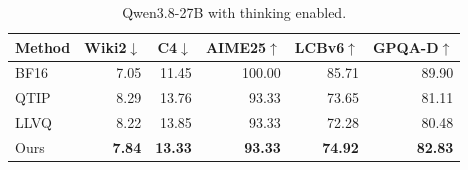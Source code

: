 \begin{table}[t]\centering\small
\caption{Qwen3.8-27B with thinking enabled.}
\label{tab:qwen38}
\begin{tabular}{lrrrrr}\toprule
Method & Wiki2$\downarrow$ & C4$\downarrow$ & AIME25$\uparrow$ & LCBv6$\uparrow$ & GPQA-D$\uparrow$\\\midrule
BF16 & 7.05 & 11.45 & 100.00 & 85.71 & 89.90\\
QTIP & 8.29 & 13.76 & 93.33 & 73.65 & 81.11\\
LLVQ & 8.22 & 13.85 & 93.33 & 72.28 & 80.48\\
Ours & \textbf{7.84} & \textbf{13.33} & \textbf{93.33} & \textbf{74.92} & \textbf{82.83}\\\bottomrule
\end{tabular}\end{table}

